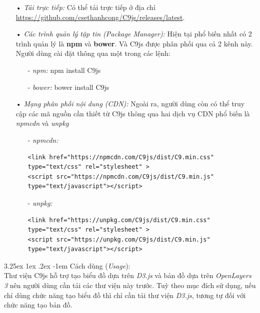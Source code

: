 \documentclass[12pt,a4paper,twoside]{article}
\makeatletter
\newcommand{\myparagraph}[1]{\paragraph{#1}\mbox{}\\} %
\renewcommand\paragraph{\@startsection{paragraph}{5}{\z@}%
  {3.25ex \@plus1ex \@minus.2ex}%
  {-1em}%
  {\normalfont\normalsize\bfseries}}
\makeatother
\begin{document}
\begin{itemize}
\item[•] \emph{Tải trực tiếp:} Có thể tải trực tiếp ở địa chỉ \url{https://github.com/csethanhcong/C9js/releases/latest}.

\item[•] \emph{Các trình quản lý tập tin (Package Manager):} Hiện tại phổ biến nhất có 2 trình quản lý là \textbf{npm} và \textbf{bower}. Và C9js được phân phối qua cả 2 kênh này. Người dùng cài đặt thông qua một trong các lệnh:

\begin{itemize}
\item[-] \textit{npm:} \textsf{npm install C9js} 
\item[-] \textit{bower:} \textsf{bower install C9js} 
\end{itemize}

\item[•] \emph{Mạng phân phối nội dung (CDN):} Ngoài ra, người dùng còn có thể truy cập các mã nguồn cần thiết từ C9js thông qua hai dịch vụ CDN phổ biến là \textit{npmcdn} và \textit{unpkg}

\begin{itemize}
\item[-] \emph{npmcdn:} 
	\begin{lstlisting}[caption=Tải mã nguồn thông qua \textit{npmcdn}]
<link href="https://npmcdn.com/C9js/dist/C9.min.css" type="text/css" rel="stylesheet" >
<script src="https://npmcdn.com/C9js/dist/C9.min.js" type="text/javascript"></script>
	\end{lstlisting}

\item[-] \emph{unpkg:}
	\begin{lstlisting}[caption=Tải mã nguồn thông qua \textit{unpkg}]
<link href="https://unpkg.com/C9js/dist/C9.min.css" type="text/css" rel="stylesheet" >
<script src="https://unpkg.com/C9js/dist/C9.min.js" type="text/javascript"></script>
	\end{lstlisting}
\end{itemize}

\end{itemize}

\myparagraph{Cách dùng (\textit{Usage}):}
Thư viện C9js hỗ trợ tạo biểu đồ dựa trên \textit{D3.js} và bản đồ dựa trên \textit{OpenLayers 3} nên người dùng cần tải các thư viện này trước. Tuỳ theo mục đích sử dụng, nếu chỉ dùng chức năng tạo biểu đồ thì chỉ cần tải thư viện \textit{D3.js}, tương tự đối với chức năng tạo bản đồ.
\end{document}
